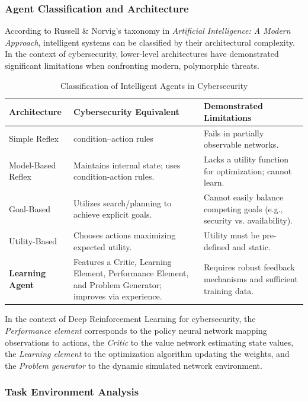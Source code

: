 \documentclass[12pt,a4paper]{report}
\begin{document}
\subsubsection*{Agent Classification and Architecture}

According to Russell \& Norvig's taxonomy in \textit{Artificial Intelligence: A Modern Approach}, intelligent systems can be classified by their architectural complexity. In the context of cybersecurity, lower-level architectures have demonstrated significant limitations when confronting modern, polymorphic threats.

\begin{table}[htbp]
\centering
\caption{Classification of Intelligent Agents in Cybersecurity}
\label{tab:agent_classification}
\begin{tabular}{L{3.5cm} L{5cm} L{6cm}}
\toprule
\textbf{Architecture} & \textbf{Cybersecurity Equivalent} & \textbf{Demonstrated Limitations} \\
\midrule
Simple Reflex & condition--action rules & Fails in partially observable networks. \\
Model-Based Reflex & Maintains internal state; uses condition-action rules. & Lacks a utility function for optimization; cannot learn. \\
Goal-Based & Utilizes search/planning to achieve explicit goals. & Cannot easily balance competing goals (e.g., security vs. availability). \\
Utility-Based & Chooses actions maximizing expected utility. & Utility must be pre-defined and static. \\
\textbf{Learning Agent} & Features a Critic, Learning Element, Performance Element, and Problem Generator; improves via experience. & Requires robust feedback mechanisms and sufficient training data. \\
\bottomrule
\end{tabular}
\end{table}

In the context of Deep Reinforcement Learning for cybersecurity, the \textit{Performance element} corresponds to the policy neural network mapping observations to actions, the \textit{Critic} to the value network estimating state values, the \textit{Learning element} to the optimization algorithm updating the weights, and the \textit{Problem generator} to the dynamic simulated network environment.

\subsubsection*{Task Environment Analysis}
\end{document}
